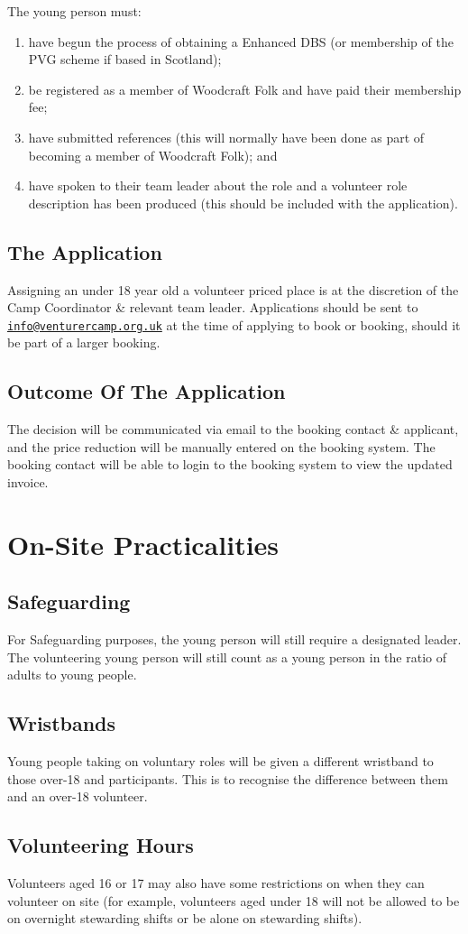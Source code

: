 \documentclass[a4paper, 11pt]{article}
\begin{document}
The young person must: 
\begin{enumerate}
    \item have begun the process of obtaining a Enhanced DBS (or membership of the PVG scheme if based in Scotland);
    \item be registered as a member of Woodcraft Folk and have paid their membership fee;
    \item have submitted references (this will normally have been done as part of becoming a member of Woodcraft Folk); and
    \item have spoken to their team leader about the role and a volunteer role description has been produced (this should be included with the application). 
\end{enumerate}

\subsection{The Application}
Assigning an under 18 year old a volunteer priced place is at the discretion of the Camp Coordinator \& relevant team leader. Applications should be sent to \href{mailto:info@venturercamp.org.uk}{\texttt{info@venturercamp.org.uk}} at the time of applying to book or booking, should it be part of a larger booking.

\subsection{Outcome Of The Application}
The decision will be communicated via email to the booking contact \& applicant, and the price reduction will be manually entered on the booking system. The booking contact will be able to login to the booking system to view the updated invoice. 

\section{On-Site Practicalities}
\subsection{Safeguarding}
For Safeguarding purposes, the young person will still require a designated leader. The volunteering young person will still count as a young person in the ratio of adults to young people.

\subsection{Wristbands}
Young people taking on voluntary roles will be given a different wristband to those over-18 and participants. This is to recognise the difference between them and an over-18 volunteer.

\subsection{Volunteering Hours}
Volunteers aged 16 or 17 may also have some restrictions on when they can volunteer on site (for example, volunteers aged under 18 will not be allowed to be on overnight stewarding shifts or be alone on stewarding shifts). 

\backPage
\end{document}
